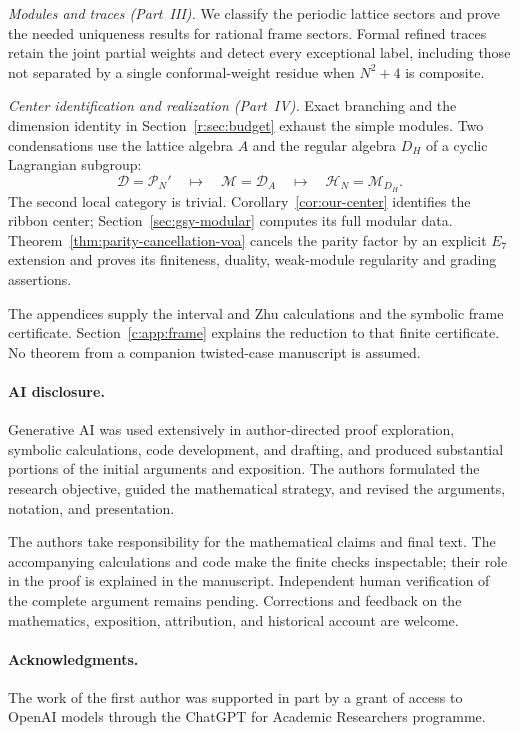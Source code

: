 \documentclass[11pt,a4paper]{article}
\numberwithin{equation}{section}
\theoremstyle{definition}\newtheorem{definition}[theorem]{Definition}
\theoremstyle{remark}\newtheorem{remark}[theorem]{Remark}
\begin{document}
\emph{Modules and traces (Part~III).}
We classify the periodic lattice sectors and prove the needed
uniqueness results for rational frame sectors. Formal refined
traces retain the joint partial weights and detect every exceptional
label, including those not separated by a single conformal-weight
residue when $N^2+4$ is composite.

\emph{Center identification and realization (Part~IV).}
Exact branching and the dimension identity in
Section~\ref{r:sec:budget} exhaust the simple modules. Two
condensations use the lattice algebra $A$ and the regular algebra
$D_H$ of a cyclic Lagrangian subgroup:
\[
 \mathcal D=\mathcal P_N'
 \quad\longmapsto\quad \mathcal M=\mathcal D_A
 \quad\longmapsto\quad \mathcal H_N=\mathcal M_{D_H}.
\]
The second local category is trivial.
Corollary~\ref{cor:our-center} identifies the ribbon center;
Section~\ref{sec:gsy-modular} computes its full modular data.
Theorem~\ref{thm:parity-cancellation-voa} cancels the parity factor by an explicit
$E_7$ extension and proves its finiteness, duality, weak-module
regularity and grading assertions.

The appendices supply the interval and Zhu calculations and the
symbolic frame certificate. Section~\ref{c:app:frame} explains the
reduction to that finite certificate. No theorem from a companion
twisted-case manuscript is assumed.

\paragraph{AI disclosure.}
Generative AI was used extensively in author-directed proof
exploration, symbolic calculations, code development, and drafting,
and produced substantial portions of the initial arguments and
exposition. The authors formulated the research objective, guided
the mathematical strategy, and revised the arguments, notation,
and presentation.

The authors take responsibility for the mathematical claims and
final text. The accompanying calculations and code make the finite
checks inspectable; their role in the proof is explained in the
manuscript. Independent human verification of the complete argument
remains pending. Corrections and feedback on the mathematics,
exposition, attribution, and historical account are welcome.

\paragraph{Acknowledgments.}
The work of the first author was supported in part by a grant of access to OpenAI models through the ChatGPT for Academic Researchers programme.
\end{document}
